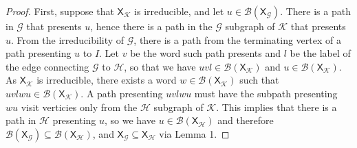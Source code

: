 \documentclass{article}
\newcommand{\Lc}{\mathcal{L}}  %
\newcommand{\Gc}{\mathcal{G}}  %
\newcommand{\Hc}{\mathcal{H}}  %
\newcommand{\Bc}{\mathcal{B}}
\newcommand{\Kc}{\mathcal{K}}
\newcommand{\shift}[1]{\mathsf{X}_{#1}}
\theoremstyle{definition}
\begin{document}
    \begin{proof}
        First, suppose that \(\shift{\Kc}\) is irreducible, and let \(u \in \Bc(\shift{\Gc})\). 
        There is a path in \(\Gc\) that presents \(u\), hence there is a path in the 
        \(\Gc\) subgraph of \(\Kc\) that presents \(u\). From the irreducibility of 
        \(\Gc\), there is a path from the terminating vertex of a path presenting 
        \(u\) to \(I\). Let \(v\) be the word such path presents and \(l\) be 
        the label of the edge connecting \(\Gc\) to \(\Hc\), so that we have 
        \(uvl \in \Bc(\shift{\Kc})\) and \(u \in \Bc(\shift{\Kc})\). As \(\shift{\Kc}\)
        is irreducible, there exists a word \(w \in \Bc(\shift{\Kc})\) such that 
        \(uvlwu \in \Bc(\shift{\Kc})\). A path presenting \(uvlwu\) must have the 
        subpath presenting \(wu\) visit verticies only from the \(\Hc\) subgraph of \(\Kc\).
        This implies that there is a path in \(\Hc\) presenting \(u\), so we have 
        \(u \in \Bc(\shift{\Hc})\) and therefore \(\Bc(\shift{\Gc}) \subseteq \Bc(\shift{\Hc})\),
        and \(\shift{\Gc} \subseteq \shift{\Hc}\) via Lemma 1.
    \end{proof}
\end{document}
